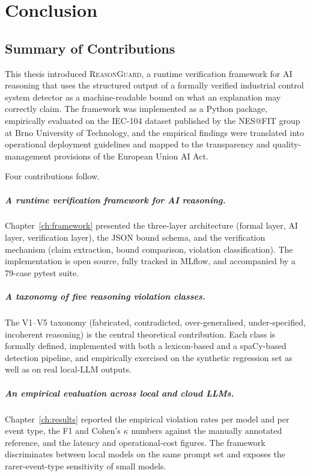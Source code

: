 \chapter{Conclusion}
\label{ch:conclusion}

\section{Summary of Contributions}
\label{sec:conclusion-summary}

This thesis introduced \textsc{ReasonGuard}, a runtime verification
framework for AI reasoning that uses the structured output of a formally
verified industrial control system detector as a machine-readable bound on
what an explanation may correctly claim. The framework was implemented as
a Python package, empirically evaluated on the IEC-104 dataset published
by the NES@FIT group at Brno University of Technology, and the empirical
findings were translated into operational deployment guidelines and mapped
to the transparency and quality-management provisions of the European
Union AI Act.

Four contributions follow.

\paragraph{A runtime verification framework for AI reasoning.}
Chapter~\ref{ch:framework} presented the three-layer architecture
(formal layer, AI layer, verification layer), the JSON bound schema, and
the verification mechanism (claim extraction, bound comparison, violation
classification). The implementation is open source, fully tracked in
MLflow, and accompanied by a 79-case pytest suite.

\paragraph{A taxonomy of five reasoning violation classes.}
The V1--V5 taxonomy (fabricated, contradicted, over-generalised,
under-specified, incoherent reasoning) is the central theoretical
contribution. Each class is formally defined, implemented with both a
lexicon-based and a spaCy-based detection pipeline, and empirically
exercised on the synthetic regression set as well as on real local-LLM
outputs.

\paragraph{An empirical evaluation across local and cloud LLMs.}
Chapter~\ref{ch:results} reported the empirical violation rates per model
and per event type, the F1 and Cohen's $\kappa$ numbers against the
manually annotated reference, and the latency and operational-cost
figures. The framework discriminates between local models on the same
prompt set and exposes the rarer-event-type sensitivity of small models.

